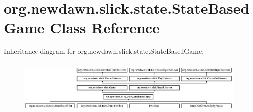 \hypertarget{classorg_1_1newdawn_1_1slick_1_1state_1_1_state_based_game}{}\section{org.\+newdawn.\+slick.\+state.\+State\+Based\+Game Class Reference}
\label{classorg_1_1newdawn_1_1slick_1_1state_1_1_state_based_game}
Inheritance diagram for org.\+newdawn.\+slick.\+state.\+State\+Based\+Game\+:\begin{figure}[H]
\begin{center}
\leavevmode
\includegraphics[height=2.641510cm]{classorg_1_1newdawn_1_1slick_1_1state_1_1_state_based_game}
\end{center}
\end{figure}
